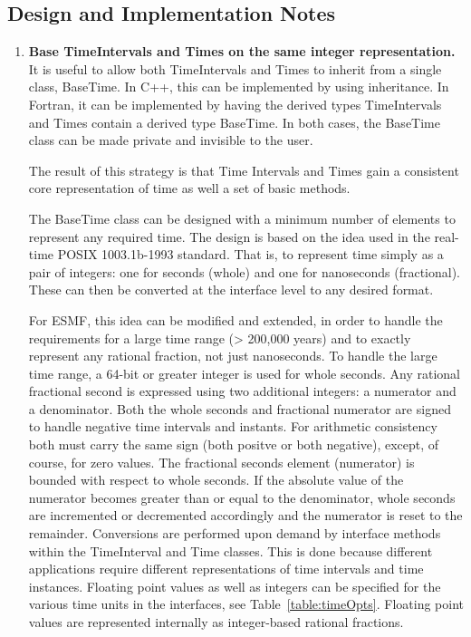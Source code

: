 
\subsection{Design and Implementation Notes}
\begin{enumerate}

\item {\bf Base TimeIntervals and Times on the same integer representation.} 
It is useful to allow both TimeIntervals and Times to 
inherit from a single class, BaseTime.  In C++, this can be
implemented by using inheritance.  In Fortran, it can be implemented
by having the derived types TimeIntervals and Times
contain a derived type BaseTime.  In both cases, the 
BaseTime class can be made private and invisible to the user.

The result of this strategy is that Time Intervals and 
Times gain a consistent core representation of time as well a set
of basic methods.

The BaseTime class can be designed with a minimum number of elements
to represent any required time.  The design is based on the idea used
in the real-time POSIX 1003.1b-1993 standard.  That is, to represent
time simply as a pair of integers: one for seconds (whole) and one for
nanoseconds (fractional).  These can then be converted at the interface
level to any desired format.

For ESMF, this idea can be modified and extended, in order to handle the
requirements for a large time range (> 200,000 years) and to exactly
represent any rational fraction, not just nanoseconds.  To handle the
large time range, a 64-bit or greater integer is used for whole seconds.
Any rational fractional second is expressed using two additional integers:
a numerator and a denominator.  Both the whole seconds and fractional
numerator are signed to handle negative time intervals and instants.
For arithmetic consistency both must carry the same sign (both positve
or both negative), except, of course, for zero values.  The fractional
seconds element (numerator) is bounded with respect to whole seconds. 
If the absolute value of the
numerator becomes greater than or equal to the denominator, whole
seconds are incremented or decremented accordingly and the numerator is
reset to the remainder.  Conversions are performed upon demand by
interface methods within the TimeInterval and
Time classes.  This is done because different applications require different
representations of time intervals and time instances.  Floating point values as well as integers can be specified for the various time units in the interfaces, see Table~\ref{table:timeOpts}.  Floating point values are represented internally as integer-based rational fractions.


\end{enumerate}
